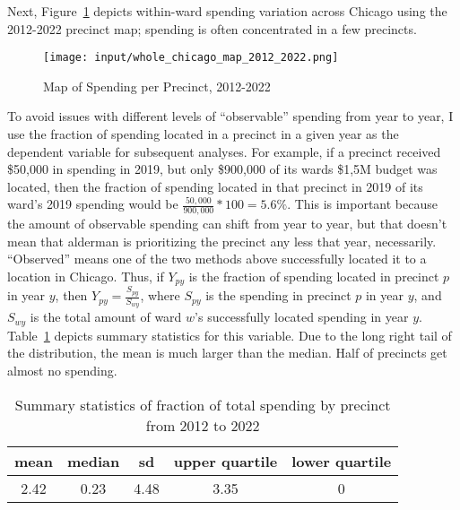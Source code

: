 Next, Figure~\ref{fig:spending_map} depicts within-ward spending variation across Chicago using the 2012-2022 precinct map; spending is often concentrated in a few precincts.

\begin{figure}[H]
    \centering
    \texttt{[image: input/whole\_chicago\_map\_2012\_2022.png]}
    \caption{Map of Spending per Precinct, 2012-2022}
    \label{fig:spending_map}
\end{figure}

To avoid issues with different levels of ``observable'' spending from year to year, I use the fraction of spending located in a precinct in a given year as the dependent variable for subsequent analyses.
For example, if a precinct received \$50,000 in spending in 2019, but only \$900,000 of its wards \$1,5M budget was located, then the fraction of spending located in that precinct in 2019 of its ward's 2019 spending would be $\frac{50,000}{900,000}*100 =5.6\%$.
This is important because the amount of observable spending can shift from year to year, but that doesn't mean that alderman is prioritizing the precinct any less that year, necessarily.
``Observed'' means one of the two methods above successfully located it to a location in Chicago.
Thus, if $Y_{py}$ is the fraction of spending located in precinct $p$ in year $y$, then $Y_{py} = \frac{S_{py}}{S_{wy}}$, where $S_{py}$ is the spending in precinct $p$ in year $y$, and $S_{wy}$ is the total amount of ward $w$'s successfully located spending in year $y$.
Table~\ref{summary_stats} depicts summary statistics for this variable.
Due to the long right tail of the distribution, the mean is much larger than the median.
Half of precincts get almost no spending.

\begin{table}[H]
\caption{Summary statistics of fraction of total spending by precinct from 2012 to 2022}\label{summary_stats}
\centering
\begin{tabular}[t]{ccccc}
\toprule
mean & median & sd & upper quartile & lower quartile\\
\midrule
2.42 & 0.23 & 4.48 & 3.35 & 0\\
\bottomrule
\end{tabular}
\end{table}